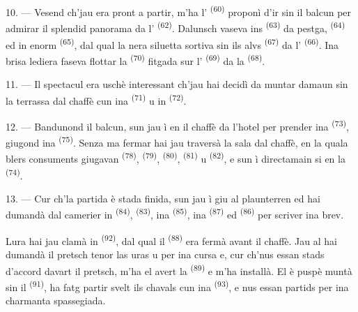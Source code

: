 10. --- Vesend ch'jau era pront a partir, m'ha l'
\textsuperscript{(60)} proponì d'ir sin il balcun per admirar il splendid panorama da
l' \textsuperscript{(62)}. Dalunsch vaseva ins 
\textsuperscript{(63)} da pestga,  \textsuperscript{(64)} ed in enorm
 \textsuperscript{(65)}, dal qual la nera siluetta sortiva sin ils alvs
 \textsuperscript{(67)} da l' \textsuperscript{(66)}. Ina brisa
lediera faseva flottar la  \textsuperscript{(70)} fitgada sur l'
\textsuperscript{(69)} da la  \textsuperscript{(68)}.

\VUsaut{3.0mm}
\VUsaut{3.0mm}

11. --- Il spectacul era uschè interessant ch'jau hai decidì da muntar damaun sin la
terrassa dal chaffè cun ina  \textsuperscript{(71)} u in 
\textsuperscript{(72)}.

12. --- Bandunond il balcun, sun jau ì en il chaffè da l'hotel per prender ina
 \textsuperscript{(73)}, giugond ina 
\textsuperscript{(75)}. Senza ma fermar hai jau traversà la sala dal chaffè, en la quala
blers consuments giugavan  \textsuperscript{(78)}, 
\textsuperscript{(79)},  \textsuperscript{(80)}, 
\textsuperscript{(81)} u  \textsuperscript{(82)}, e sun ì directamain si en la
 \textsuperscript{(74)}.

13. --- Cur ch'la partida è stada finida, sun jau ì giu al plaunterren ed hai dumandà
dal camerier in  \textsuperscript{(84)},  \textsuperscript{(83)},
ina  \textsuperscript{(85)}, ina  \textsuperscript{(87)} ed
 \textsuperscript{(86)} per scriver ina brev.

Lura hai jau clamà in  \textsuperscript{(92)}, dal qual il
 \textsuperscript{(88)} era fermà avant il chaffè. Jau al hai dumandà il
pretsch tenor las uras u per ina cursa e, cur ch'nus essan stads d'accord davart il
pretsch, m'ha el avert la  \textsuperscript{(89)} e m'ha
installà. El è puspè muntà sin il  \textsuperscript{(91)}, ha fatg partir
svelt ils chavals cun ina  \textsuperscript{(93)}, e nus essan partids per
ina charmanta spassegiada.

\VUsaut{6.0mm}
\VUfilet{22mm}
